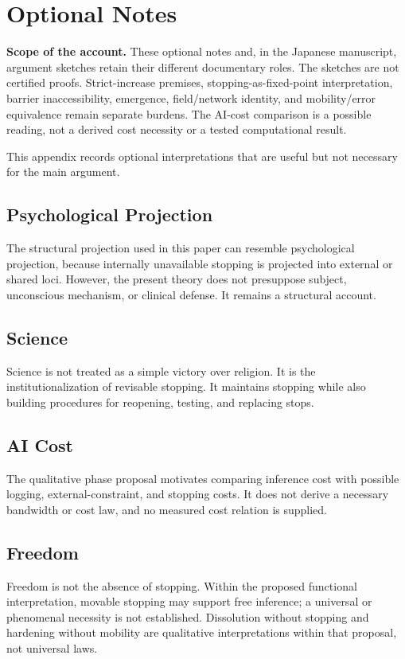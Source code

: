 \section{Optional Notes}

\noindent\textbf{Scope of the account.} These optional notes and, in the Japanese manuscript, argument sketches retain their different documentary roles. The sketches are not certified proofs. Strict-increase premises, stopping-as-fixed-point interpretation, barrier inaccessibility, emergence, field/network identity, and mobility/error equivalence remain separate burdens. The AI-cost comparison is a possible reading, not a derived cost necessity or a tested computational result.


This appendix records optional interpretations that are useful but not necessary for the main argument.

\subsection{Psychological Projection}

The structural projection used in this paper can resemble psychological projection, because internally unavailable stopping is projected into external or shared loci. However, the present theory does not presuppose subject, unconscious mechanism, or clinical defense. It remains a structural account.

\subsection{Science}

Science is not treated as a simple victory over religion. It is the institutionalization of revisable stopping. It maintains stopping while also building procedures for reopening, testing, and replacing stops.

\subsection{AI Cost}

The qualitative phase proposal motivates comparing inference cost with possible logging, external-constraint, and stopping costs. It does not derive a necessary bandwidth or cost law, and no measured cost relation is supplied.

\subsection{Freedom}

Freedom is not the absence of stopping. Within the proposed functional interpretation, movable stopping may support free inference; a universal or phenomenal necessity is not established. Dissolution without stopping and hardening without mobility are qualitative interpretations within that proposal, not universal laws.

\bigskip
